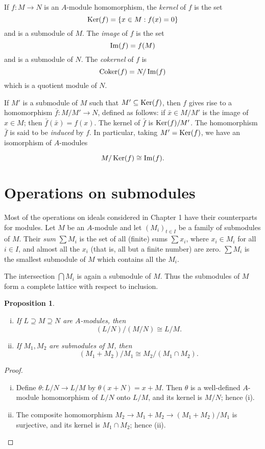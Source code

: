 \documentclass{standalone}
\newtheorem{proposition}[theorem]{Proposition}
\theoremstyle{definition}
\theoremstyle{remark}
\begin{document}
If $f\colon M \to N$ is an $A$-module homomorphism, the \textit{kernel} of $f$ is the
set
\[
  \operatorname{Ker}(f)=\{x \in M: f(x)=0\}
\]
and is a submodule of $M$. The \textit{image} of $f$ is the set
\[
  \operatorname{Im}(f)=f(M)
\]
and is a submodule of $N$. The \textit{cokernel} of $f$ is
\[
  \operatorname{Coker}(f)=N / \operatorname{Im}(f)
\]
which is a quotient module of $N$.

If $M'$ is a submodule of $M$ such that $M' \subseteq \operatorname{Ker}(f)$, then $f$ gives
rise to a homomorphism $\bar{f}\colon M / M' \to N$, defined as follows: if
$\bar{x} \in M / M'$ is the image of $x \in M$; then $\bar{f}(\bar{x})=f(x)$.
The kernel of $\bar{f}$ is $\operatorname{Ker}(f) / M'$. The homomorphism $\bar{f}$ is said to
be \textit{induced} by $f$. In particular, taking $M'=\operatorname{Ker}(f)$, we have an
isomorphism of $A$-modules

\[
  M / \operatorname{Ker}(f) \cong \operatorname{Im}(f) .
\]

\section{Operations on submodules}
Most of the operations on ideals considered in Chapter 1 have their counterparts
for modules. Let $M$ be an $A$-module and let $(M_{i})_{t \in I}$ be
a family of submodules of $M$. Their \textit{sum} $\sum M_{i}$ is the set of all
(finite) sums $\sum x_{i}$, where $x_{i} \in M_{i}$ for all $i \in I$, and
almost all the $x_{i}$ (that is, all but a finite number) are zero. $\sum M_{i}$
is the smallest submodule of $M$ which contains all the $M_{i}$.

The intersection $\bigcap M_{i}$ is again a submodule of $M$. Thus the
submodules of $M$ form a complete lattice with respect to inclusion.
\begin{proposition}\label{prop:2.1}
  \begin{enumerate}[i)]
    \item If $L \supseteq M \supseteq N$ are $A$-modules, then
          \[
          (L / N) /(M / N) \cong L / M .
          \]
    \item If $M_{1}, M_{2}$ are submodules of $M$, then
          \[
          (M_{1}+M_{2}) / M_{1} \cong M_{2} /(M_{1} \cap M_{2}) .
          \]
  \end{enumerate}
\end{proposition}
\begin{proof}
  \begin{enumerate}[i)]
    \item Define $\theta: L / N \to L / M$ by $\theta(x+N)=x+M$. Then $\theta$
          is a well-defined $A$-module homomorphism of $L / N$ onto $L / M$, and
          its kernel is $M / N$; hence (i).
    \item The composite homomorphism
          $M_{2} \to M_{1}+M_{2} \to(M_{1}+M_{2}) / M_{1}$ is
          surjective, and its kernel is $M_{1} \cap M_{2}$; hence (ii).\qedhere
  \end{enumerate}
\end{proof}
\end{document}
